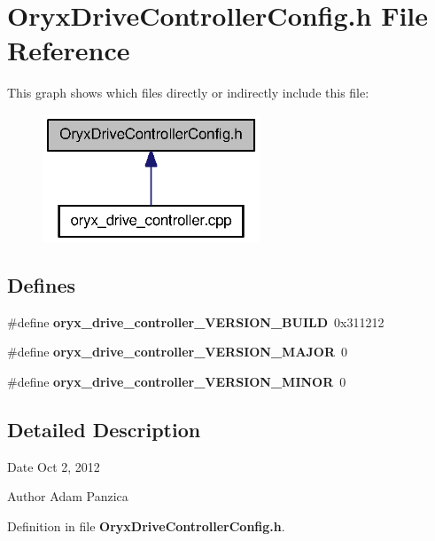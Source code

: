 \section{\-Oryx\-Drive\-Controller\-Config.\-h \-File \-Reference}
\label{OryxDriveControllerConfig_8h}
\-This graph shows which files directly or indirectly include this file\-:
\nopagebreak
\begin{figure}[H]
\begin{center}
\leavevmode
\includegraphics[width=184pt]{OryxDriveControllerConfig_8h__dep__incl}
\end{center}
\end{figure}
\subsection*{\-Defines}
\begin{DoxyCompactItemize}
\item 
\#define {\bf oryx\-\_\-drive\-\_\-controller\-\_\-\-V\-E\-R\-S\-I\-O\-N\-\_\-\-B\-U\-I\-L\-D}~0x311212
\item 
\#define {\bf oryx\-\_\-drive\-\_\-controller\-\_\-\-V\-E\-R\-S\-I\-O\-N\-\_\-\-M\-A\-J\-O\-R}~0
\item 
\#define {\bf oryx\-\_\-drive\-\_\-controller\-\_\-\-V\-E\-R\-S\-I\-O\-N\-\_\-\-M\-I\-N\-O\-R}~0
\end{DoxyCompactItemize}


\subsection{\-Detailed \-Description}
\begin{DoxyDate}{\-Date}
\-Oct 2, 2012 
\end{DoxyDate}
\begin{DoxyAuthor}{\-Author}
\-Adam \-Panzica 
\end{DoxyAuthor}


\-Definition in file {\bf \-Oryx\-Drive\-Controller\-Config.\-h}.



